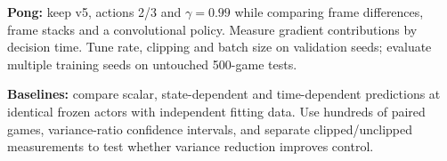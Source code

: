 \documentclass[11pt,letterpaper]{article}
\begin{document}
\textbf{Pong:} keep v5, actions 2/3 and $\gamma=0.99$ while comparing frame differences, frame stacks and a convolutional policy. Measure gradient contributions by decision time. Tune rate, clipping and batch size on validation seeds; evaluate multiple training seeds on untouched 500-game tests.

\textbf{Baselines:} compare scalar, state-dependent and time-dependent predictions at identical frozen actors with independent fitting data. Use hundreds of paired games, variance-ratio confidence intervals, and separate clipped/unclipped measurements to test whether variance reduction improves control.
\end{document}
